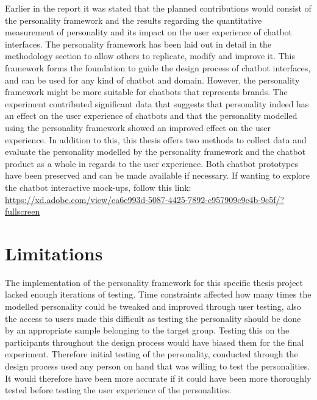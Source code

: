 Earlier in the report it was stated that the planned contributions would consist of the personality framework and the results regarding the quantitative measurement of personality and its impact on the user experience of chatbot interfaces. The personality framework has been laid out in detail in the methodology section to allow others to replicate, modify and improve it. This framework forms the foundation to guide the design process of chatbot interfaces, and can be used for any kind of chatbot and domain. However, the personality framework might be more suitable for chatbots that represents brands. The experiment contributed significant data that suggests that personality indeed has an effect on the user experience of chatbots and that the personality modelled using the personality framework showed an improved effect on the user experience. In addition to this, this thesis offers two methods to collect data and evaluate the personality modelled by the personality framework and the chatbot product as a whole in regards to the user experience. Both chatbot prototypes have been preserved and can be made available if necessary. If wanting to explore the chatbot interactive mock-ups, follow this link: \url{https://xd.adobe.com/view/ea6e993d-5087-4425-7892-c957909c9c4b-9c5f/?fullscreen}

\section{Limitations}

The implementation of the personality framework for this specific thesis project lacked enough iterations of testing. Time constraints affected how many times the modelled personality could be tweaked and improved through user testing, also the access to users made this difficult as testing the personality should be done by an appropriate sample belonging to the target group. Testing this on the participants throughout the design process would have biased them for the final experiment. Therefore initial testing of the personality, conducted through the design process used any person on hand that was willing to test the personalities. It would therefore have been more accurate if it could have been more thoroughly tested before testing the user experience of the personalities.

